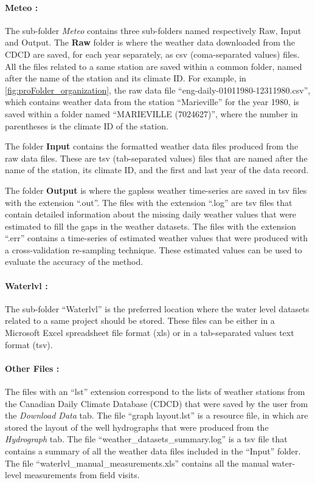 \documentclass[WHATMANUAL.tex]{subfiles}
\begin{document}
\paragraph{Meteo :} The sub-folder \emph{Meteo} contains three sub-folders named respectively Raw, Input and Output. The \textbf{Raw} folder is where the weather data downloaded from the CDCD are saved, for each year separately, as csv (coma-separated values) files. All the files related to a same station are saved within a common folder, named after the name of the station and its climate ID. For example, in \cref{fig:proFolder_organization}, the raw data file ``eng-daily-01011980-12311980.csv'', which contains weather data from the station ``Marieville'' for the year 1980, is saved within a folder named ``MARIEVILLE (7024627)'', where the number in parentheses is the climate ID of the station.

The folder \textbf{Input} contains the formatted weather data files produced from the raw data files. These are tsv (tab-separated values) files that are named after the name of the station, its climate ID, and the first and last year of the data record.

The folder \textbf{Output} is where the gapless weather time-series are saved in tsv files with the extension ``.out''. The files with the extension ``.log'' are tsv files that contain detailed information about the missing daily weather values that were estimated to fill the gaps in the weather datasets. The files with the extension ``.err'' contains a time-series of estimated weather values that were produced with a cross-validation re-sampling technique. These estimated values can be used to evaluate the accuracy of the method.

\paragraph{Waterlvl :} The sub-folder ``Waterlvl'' is the preferred location where the water level datasets related to a same project should be stored. These files can be  either in a Microsoft Excel spreadsheet file format (xls) or in a tab-separated values text format (tsv).

\paragraph{Other Files :} The files with an ``lst'' extension correspond to the lists of weather stations from the Canadian Daily Climate Database (CDCD) that were saved by the user from the \emph{Download Data} tab. The file ``graph layout.lst'' is a resource file, in which are stored the layout of the well hydrographs that were produced from the \emph{Hydrograph} tab. The file ``weather\_datasets\_summary.log'' is a tsv file that contains a summary of all the weather data files included in the ``Input'' folder. The file ``waterlvl\_manual\_measurements.xls'' contains all the manual water-level measurements from field visits.
\end{document}
